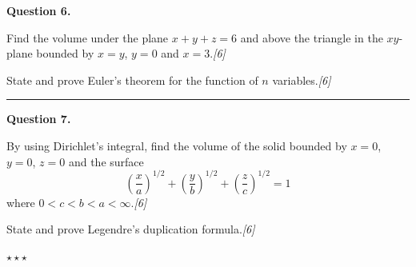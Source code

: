 \documentclass[11pt,a4paper]{article}
\newcommand{\pts}[1]{\hfill   \textit{[#1]}}
\begin{document}
\medskip


\noindent   \textbf{Question 6.}

\begin{parts}
  \item Find the volume under the plane $x + y + z = 6$ and above the triangle in the $xy$-plane bounded by $x = y$, $y = 0$ and $x = 3$.\pts{6}
  \item State and prove Euler's theorem for the function of $n$ variables.\pts{6}
\end{parts}
\medskip\rule{\linewidth}{0.2pt}

\medskip


\noindent   \textbf{Question 7.}

\begin{parts}
  \item By using Dirichlet's integral, find the volume of the solid bounded by $x = 0$, $y = 0$, $z = 0$ and the surface
  \[
    \left(\frac{x}{a}\right)^{1/2} + \left(\frac{y}{b}\right)^{1/2} + \left(\frac{z}{c}\right)^{1/2} = 1
  \]
  where $0 < c < b < a < \infty$.\pts{6}
  \item State and prove Legendre's duplication formula.\pts{6}
\end{parts}

\bigskip

\begin{center}
  $\star \star \star$
\end{center}
\end{document}
